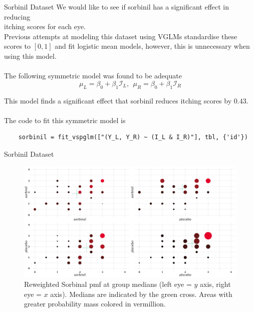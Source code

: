 \documentclass[9pt,notes=hide]{beamer}
\newcommand{\linkcolor}{Data61 green}
\newcommand{\vermillion}{Data61 vermillion}
\begin{document}
\begin{frame}[fragile]{Sorbinil Dataset}
	We would like to see if sorbinil has a significant effect in reducing\\
	itching scores for each eye.
	\vspace{0.3cm}\\
	\pause
	Previous attempts at modeling this dataset using VGLMs standardise
	these scores to $[0,1]$ and fit logistic mean models,
	however, this is  unnecessary when using this model. \\
	\pause
	\vspace{0.1cm}\\
	The following symmetric model was found to be adequate
	\[
		\mu_L = \beta_0 + \beta_1 \mathcal{I}_L,  \  \ \mu_R = \beta_0 + \beta_1 \mathcal{I}_R
	\]

	\pause
	This model finds  a significant effect that sorbinil reduces itching scores by $0.43$.\\
	\pause
	\vspace{0.5cm}\\
	The code to fit this symmetric model is
	\begin{verbatim}
    sorbinil = fit_vspglm(["(Y_L, Y_R) ~ (I_L & I_R)"], tbl, {'id'})
 \end{verbatim}
\end{frame}


\begin{frame}{Sorbinil Dataset}
	\begin{figure}
		\centering
		\includegraphics[width= \linewidth]{figures/sorbinil_pmfs.png}
		\caption{
			{\small Reweighted Sorbinal pmf at group medians (left eye = $y$ axis, right eye = $x$ axis).
					Medians are indicated by the \textcolor{\linkcolor}{green} cross.
					Areas with greater probability mass colored in \textcolor{\vermillion}{vermillion}.}}
	\end{figure}
\end{frame}
\end{document}
